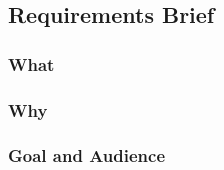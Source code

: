 \subsection{Requirements Brief}
\subsubsection{What}
\subsubsection{Why}
\subsubsection{Goal and Audience}

